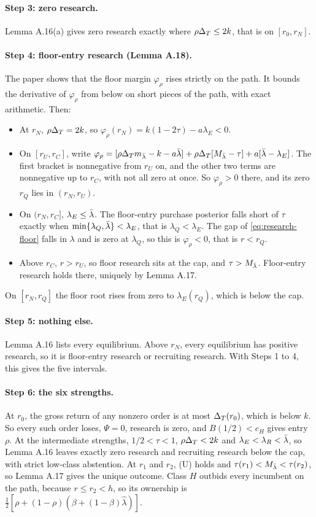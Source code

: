 \paragraph{Step 3: zero research.} Lemma A.16(a) gives zero research exactly where \(\rho\Delta_T\le2k\), that is on
\([r_0,r_N]\).

\paragraph{Step 4: floor-entry research (Lemma A.18).} The paper shows that the floor margin \(\varphi_\rho\) rises
strictly on the path. It bounds the derivative of \(\varphi_\rho\) from below on short pieces of the path, with exact
arithmetic. Then:
\begin{itemize}
\item At \(r_N\), \(\rho\Delta_T=2k\), so \(\varphi_\rho(r_N)=k(1-2\tau)-a\lambda_E<0\).
\item On \([r_U,r_C]\), write
\(\varphi_\rho=[\rho\Delta_T m_{\bar\lambda}-k-a\bar\lambda]+\rho\Delta_T[M_{\bar\lambda}-\tau]+a[\bar\lambda-\lambda_E]\). The first bracket is nonnegative from
\(r_U\) on, and the other two terms are nonnegative up to \(r_C\), with not all zero at once. So \(\varphi_\rho>0\)
there, and its zero \(r_Q\) lies in \((r_N,r_U)\).
\item On \((r_N,r_C]\), \(\lambda_E\le\bar\lambda\). The floor-entry purchase posterior falls short of \(\tau\) exactly when
\(\min\{\lambda_Q,\bar\lambda\}<\lambda_E\), that is \(\lambda_Q<\lambda_E\). The gap of \eqref{eq:research-floor} falls in
\(\lambda\) and is zero at \(\lambda_Q\), so this is \(\varphi_\rho<0\), that is \(r<r_Q\).
\item Above \(r_C\), \(r>r_U\), so floor research sits at the cap, and \(\tau>M_{\bar\lambda}\). Floor-entry research holds
there, uniquely by Lemma A.17.
\end{itemize}
On \([r_N,r_Q]\) the floor root rises from zero to \(\lambda_E(r_Q)\), which is below the cap.

\paragraph{Step 5: nothing else.} Lemma A.16 lists every equilibrium. Above \(r_N\), every equilibrium has positive
research, so it is floor-entry research or recruiting research. With Steps 1 to 4, this gives the five intervals.

\paragraph{Step 6: the six strengths.} At \(r_0\), the gross return of any nonzero order is at most \(\Delta_T(r_0)\), which
is below \(k\). So every such order loses, \(\Psi=0\), research is zero, and \(B(1/2)<c_H\) gives entry \(\rho\). At the
intermediate strengths, \(1/2<\tau<1\), \(\rho\Delta_T<2k\) and \(\lambda_E<\lambda_R<\bar\lambda\), so Lemma A.16 leaves exactly zero
research and recruiting research below the cap, with strict low-class abstention. At \(r_1\) and \(r_2\), (U) holds and
\(\tau(r_1)<M_{\bar\lambda}<\tau(r_2)\), so Lemma A.17 gives the unique outcome. Class \(H\) outbids every incumbent on the path,
because \(r\le r_2<h\), so its ownership is \(\tfrac12[\rho+(1-\rho)(\beta+(1-\beta)\hat\lambda)]\).

